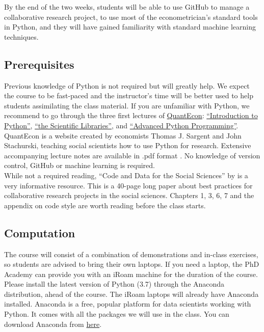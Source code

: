\documentclass{amsart}
\theoremstyle{definition}
\theoremstyle{remark}
\numberwithin{equation}{section}
\begin{document}
By the end of the two weeks, students will be able to use GitHub to manage a collaborative research project, to use most of the econometrician's standard tools in Python, and they will have gained familiarity with standard machine learning techniques.

\subsection*{Prerequisites}

Previous knowledge of Python is not required but will greatly help. We expect the course to be fast-paced and the instructor's time will be better used to help students assimilating the class material. If you are unfamiliar with Python, we recommend to go through the three first lectures of \href{https://lectures.quantecon.org/py/}{QuantEcon}: \href{https://lectures.quantecon.org/py/index_learning_python.html}{``Introduction to Python''}, \href{https://lectures.quantecon.org/py/index_python_scientific_libraries.html}{``the Scientific Libraries''}, and \href{https://lectures.quantecon.org/py/index_advanced_python_programming.html}{``Advanced Python Programming''}. QuantEcon is a website created by economists Thomas J. Sargent and John Stachurski, teaching social scientists how to use Python for research. Extensive accompanying lecture notes are available in .pdf format \citep{sargent2019lectures}. No knowledge of version control, GitHub or machine learning is required.\\

While not a required reading, ``Code and Data for the Social Sciences'' by \cite{gentzkow2014code} is a very informative resource. This is a 40-page long paper about best practices for collaborative research projects in the social sciences. Chapters 1, 3, 6, 7 and the appendix on code style are worth reading before the class starts.

\subsection*{Computation}

The course will consist of a combination of demonstrations and in-class exercises, so students are advised to bring their own laptops. If you need a laptop, the PhD Academy can provide you with an iRoam machine for the duration of the course.\\

Please install the latest version of Python (3.7) through the Anaconda distribution, ahead of the course. The iRoam laptops will already have Anaconda installed. Anaconda is a free, popular platform for data scientists working with Python. It comes with all the packages we will use in the class. You can download Anaconda from \href{https://www.anaconda.com/distribution/}{here}.
\end{document}
